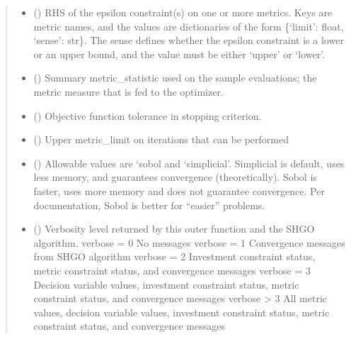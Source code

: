 \documentclass[letterpaper,10pt,english]{sphinxmanual}
\begin{document}
\begin{fulllineitems}
\begin{fulllineitems}
\begin{quote}
\begin{description}
\begin{itemize}
\item {} 
 () \textendash{} RHS of the epsilon constraint(s) on one or more metrics. Keys are metric
names, and the values are dictionaries of the form
\{‘limit’: float, ‘sense’: str\}. The sense defines whether the epsilon
constraint is a lower or an upper bound, and the value must be either
‘upper’ or ‘lower’.

\item {} 
 () \textendash{} Summary metric\_statistic used on the sample evaluations; the metric
measure that is fed to the optimizer.

\item {} 
 () \textendash{} Objective function tolerance in stopping criterion.

\item {} 
 () \textendash{} Upper metric\_limit on iterations that can be performed

\item {} 
 () \textendash{} Allowable values are ‘sobol and ‘simplicial’. Simplicial is default, uses
less memory, and guarantees convergence (theoretically). Sobol is faster,
uses more memory and does not guarantee convergence. Per documentation,
Sobol is better for “easier” problems.

\item {} 
 () \textendash{} Verbosity level returned by this outer function and the SHGO algorithm.
verbose = 0     No messages
verbose = 1     Convergence messages from SHGO algorithm
verbose = 2     Investment constraint status, metric constraint status,
and convergence messages
verbose = 3     Decision variable values, investment constraint status,
metric constraint status, and convergence messages
verbose \textgreater{} 3     All metric values, decision variable values, investment
constraint status, metric constraint status, and
convergence messages

\end{itemize}


\end{description}
\end{quote}
\end{fulllineitems}
\end{fulllineitems}
\end{document}

